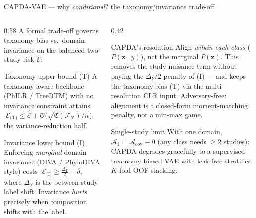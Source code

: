 \documentclass[aspectratio=169,11pt]{beamer}
\newcommand{\Tree}{\mathcal T}
\begin{document}
\begin{frame}{CAPDA-VAE --- why \emph{conditional}? the taxonomy/invariance trade-off}
  \begin{columns}[T]
    \begin{column}{0.58\textwidth}
      A formal trade-off governs taxonomy bias vs.\ domain invariance on the
      balanced two-study risk $\mathcal E$:
      \begin{block}{Taxonomy upper bound (T)}
        \footnotesize
        A taxonomy-aware backbone (PhILR / TreeDTM) with no invariance constraint
        attains
        $\;\mathcal E_{\text{(T)}}\le \widehat{\mathcal E}+\mathcal O\!\big(\sqrt{\mathfrak C(\mathcal F_\Tree)/n}\big)$,
        the variance-reduction half.
      \end{block}
      \begin{alertblock}{Invariance lower bound (I)}
        \footnotesize
        Enforcing \emph{marginal} domain invariance (DIVA / PhyloDIVA style) costs
        $\;\mathcal E_{\text{(I)}}\ge \tfrac{\Delta_Y}{2}-\delta$,
        where $\Delta_Y$ is the between-study label shift. Invariance \emph{hurts}
        precisely when composition shifts with the label.
      \end{alertblock}
    \end{column}
    \begin{column}{0.42\textwidth}
      \begin{exampleblock}{CAPDA's resolution}
        \footnotesize
        Align \emph{within each class} ($P(\mathbf z\mid y)$), not the marginal
        $P(\mathbf z)$. This removes the study nuisance term without paying the
        $\Delta_Y/2$ penalty of (I) --- and keeps the taxonomy bias (T) via the
        multi-resolution CLR input. Adversary-free: alignment is a closed-form
        moment-matching penalty, not a min-max game.
      \end{exampleblock}
      \begin{block}{Single-study limit}
        \footnotesize
        With one domain, $\mathcal A_1\!=\!\mathcal A_{\mathrm{cov}}\!\equiv\!0$ (any class
        needs $\ge2$ studies): CAPDA degrades gracefully to a supervised taxonomy-biased
        VAE with leak-free stratified $K$-fold OOF stacking.
      \end{block}
    \end{column}
  \end{columns}
\end{frame}

\end{document}
